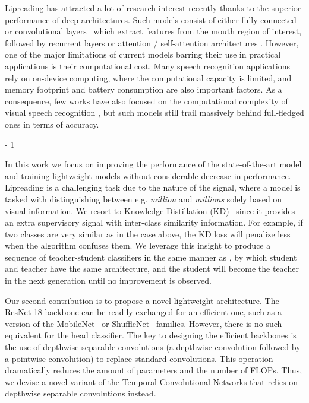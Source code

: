 \documentclass{article}
\begin{document}
Lipreading has attracted a lot of research interest recently thanks to the superior performance of deep architectures. Such models consist of either fully connected \cite{petridis2017deepVisualSpeech,petridis2018visualWhisper, petridis2017end,wand16,petridis17AV} or convolutional layers~\cite{stafylakis17, shillingford2018large, afouras2018deep, chung16b} which extract features from the mouth region of interest, followed by recurrent layers or attention \cite{chung16b,petridis2018audio} / self-attention architectures \cite{afouras2018deep}. However, one of the major limitations of current models barring their use in practical applications is  their computational cost. Many speech recognition applications rely on on-device computing, where the computational capacity is limited, and memory footprint and battery consumption are also important factors. As a consequence, few works have also focused on the computational complexity of visual speech recognition \cite{koumparoulis2019mobilipnet, shrivastava2019mobivsr}, but such models still trail massively behind full-fledged ones in terms of accuracy.

\looseness - 1

In this work we focus on improving the performance of the state-of-the-art model and training lightweight models without considerable decrease in performance.  Lipreading is a challenging task due to the nature of the signal, where a model is tasked with distinguishing between e.g. \textit{million} and \textit{millions} solely based on visual information. We resort to Knowledge Distillation (KD)~\cite{hinton2014distilling} since it provides an extra supervisory signal with inter-class similarity information. For example, if two classes are very similar as in the case above, the KD loss will penalize less when the algorithm confuses them. We leverage this insight to produce a sequence of teacher-student classifiers in the same manner as \cite{furlanello2018born, yang2018knowledge}, by which student and teacher have the same architecture, and the student will become the teacher in the next generation until no improvement is observed.

Our second contribution is to propose a novel lightweight architecture. The ResNet-18 backbone can be readily exchanged for an efficient one, such as a version of the MobileNet~\cite{howard2017mobilenets} or ShuffleNet~\cite{ma2018shufflenet} families. However, there is no such equivalent for the head classifier. The key to designing the efficient backbones is the use of depthwise separable convolutions (a depthwise convolution followed by a pointwise convolution) \cite{chollet2017xception} to replace standard convolutions. This operation dramatically reduces the amount of parameters and the number of FLOPs. Thus, we devise a novel variant of the Temporal Convolutional Networks that relies on depthwise separable convolutions instead. 
\end{document}
